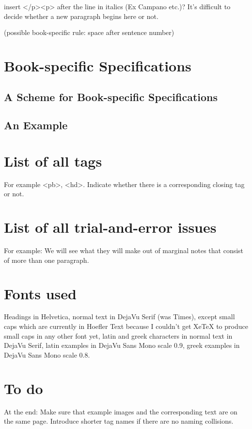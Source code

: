 insert </p><p> after the line in italics (Ex Campano etc.)? It's difficult to decide whether a new paragraph begins here or not.

(possible book-specific rule: space after sentence number)


\section{Book-specific Specifications}

\subsection{A Scheme for Book-specific Specifications}

\subsection{An Example}

\appendix
\section{List of all tags}

For example <pb>, <hd>. Indicate whether there is a corresponding closing tag or not.

\section{List of all trial-and-error issues}

For example: We will see what they will make out of marginal notes that consist of more than one paragraph.

\section{Fonts used}

Headings in Helvetica, normal text in DejaVu Serif (was Times), except small caps which are currently in Hoefler Text because I couldn't get XeTeX to produce small caps in any other font yet, latin and greek characters in normal text in DejaVu Serif, latin examples in DejaVu Sans Mono scale 0.9, greek examples in DejaVu Sans Mono scale 0.8.

\section{To do}

At the end: Make sure that example images and the corresponding text are on the same page. Introduce shorter tag names if there are no naming collisions.


